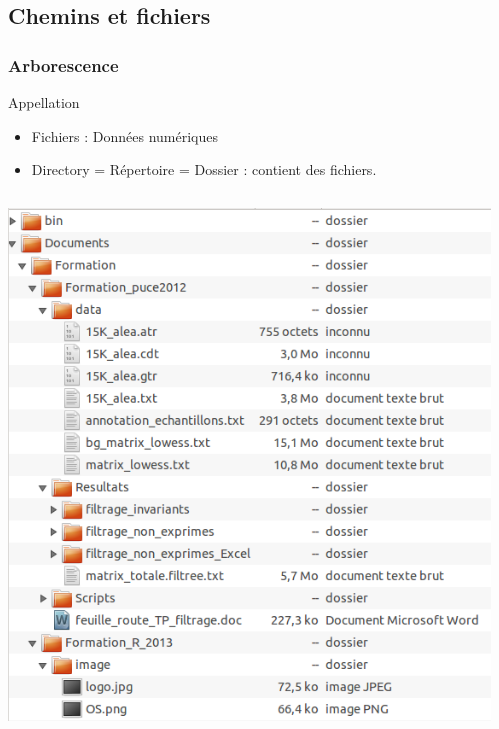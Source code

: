 \documentclass[handout, table,svgnames,hyperref={pdfpagemode=FullScreen}]{beamer}
\begin{document}
\subsection{Chemins et fichiers}
\begin{frame}
	\frametitle{Arborescence}
	\begin{block}{Appellation}
		\begin{itemize}
			\item Fichiers : Données numériques
			\item Directory = Répertoire = Dossier : contient des fichiers.
		\end{itemize}
	\end{block}
	\begin{columns}
		\begin{column}[c]{5cm}
			\includegraphics[scale=0.25]{image/ArboUbuntu.png}
		\end{column}
			\begin{column}[c]{5cm}

\end{column}
\end{columns}
\end{frame}
\end{document}
